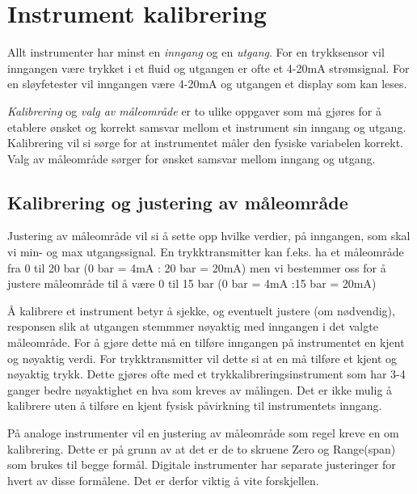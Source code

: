 
\chapter{Instrument kalibrering}

Allt instrumenter har minst en \textit{inngang} og en \textit{utgang}. For en trykksensor vil inngangen være trykket i et fluid og utgangen er ofte et 4-20mA strømsignal. For en sløyfetester vil inngangen være 4-20mA og utgangen et display som kan leses. 

\textit{Kalibrering} og \textit{valg av måleområde} er to ulike oppgaver som må gjøres for å etablere ønsket og korrekt samsvar mellom et instrument sin inngang og utgang. Kalibrering vil si sørge for at instrumentet måler den fysiske variabelen korrekt. Valg av måleområde sørger for ønsket samsvar mellom inngang og utgang. 





\filbreak
\section{Kalibrering og justering av måleområde}

Justering av måleområde vil si å sette opp hvilke verdier, på inngangen, som  skal vi min- og max utgangssignal. En trykktransmitter kan f.eks. ha et måleområde fra 0 til 20 bar (0 bar = 4mA : 20 bar = 20mA) men vi bestemmer oss for å justere måleområde til å være 0 til 15 bar (0 bar = 4mA :15 bar = 20mA)

Å kalibrere et instrument betyr å sjekke, og eventuelt justere (om nødvendig), responsen slik at utgangen stemmmer nøyaktig med inngangen i det valgte måleområde. For å gjøre dette må en tilføre inngangen på instrumentet en kjent og nøyaktig verdi. For trykktransmitter vil dette si at en må tilføre et kjent og nøyaktig trykk. Dette gjøres ofte med et trykkalibreringsinstrument som har 3-4 ganger bedre nøyaktighet en hva som kreves av målingen. Det er ikke mulig å kalibrere uten å tilføre en kjent fysisk påvirkning til instrumentets inngang. 

På analoge instrumenter vil en justering av måleområde som regel kreve en om kalibrering. Dette er på grunn av  at det er de to skruene Zero og Range(span) som brukes til begge formål. Digitale instrumenter har separate justeringer for hvert av disse formålene. Det er derfor viktig å vite forskjellen. 





